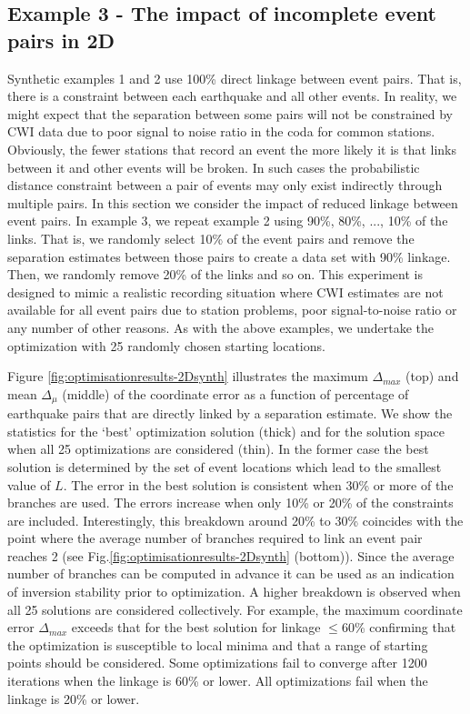 \documentclass[12pt,double]{article}
\begin{document}
\subsection*{Example 3 - The impact of incomplete event pairs in 2D}

Synthetic examples 1 and 2 use 100\% direct linkage between event
pairs. That is, there is a constraint between each earthquake and
all other events. In reality, we might expect that the separation
between some pairs will not be constrained by CWI data due to poor
signal to noise ratio in the coda for common stations. Obviously,
the fewer stations that record an event the more likely it is that
links between it and other events will be broken. In such cases the
probabilistic distance constraint between a pair of events may only
exist indirectly through multiple pairs. In this section we consider
the impact of reduced linkage between event pairs. In example 3, we
repeat example 2 using 90\%, 80\%, ..., 10\% of the links. 
That is, we randomly select 10\% of the event pairs and remove the 
separation estimates between those pairs to create a data set with 90\% 
linkage. Then, we randomly remove 20\% of the links and so on. 
This experiment is designed to mimic a realistic recording situation 
where CWI estimates are not available for all event pairs due to station 
problems, poor signal-to-noise ratio or any number of other reasons.
As with the above examples, we undertake the optimization with 25 randomly
chosen starting locations.


Figure \ref{fig:optimisationresults-2Dsynth} illustrates
the maximum $\Delta_{max}$ (top) and mean $\Delta_\mu$ (middle) of
the coordinate error as a function of percentage of earthquake pairs
that are directly linked by a separation estimate. We show the
statistics for the `best' optimization solution (thick) and for the
solution space when all 25 optimizations are considered (thin). In
the former case the best solution is determined by the set of event
locations which lead to the smallest value of $L$. The error in the
best solution is consistent when 30\% or more of the branches are
used. The errors increase when only 10\% or 20\% of the constraints
are included. Interestingly, this breakdown around 20\% to 30\%
coincides with the point where the average number of branches
required to link an event pair reaches 2 (see
Fig.\ref{fig:optimisationresults-2Dsynth} (bottom)). Since the
average number of branches can be computed in advance it can be used
as an indication of inversion stability prior to optimization. A
higher breakdown is observed when all 25 solutions are considered
collectively. For example, the maximum coordinate error
$\Delta_{max}$ exceeds that for the best solution for linkage
$\leq$60\% confirming that the optimization is susceptible to local
minima and that a range of starting points should be considered.
Some optimizations fail to converge after 1200 iterations when the
linkage is 60\% or lower. All optimizations fail when the linkage is
20\% or lower. 
\end{document}
